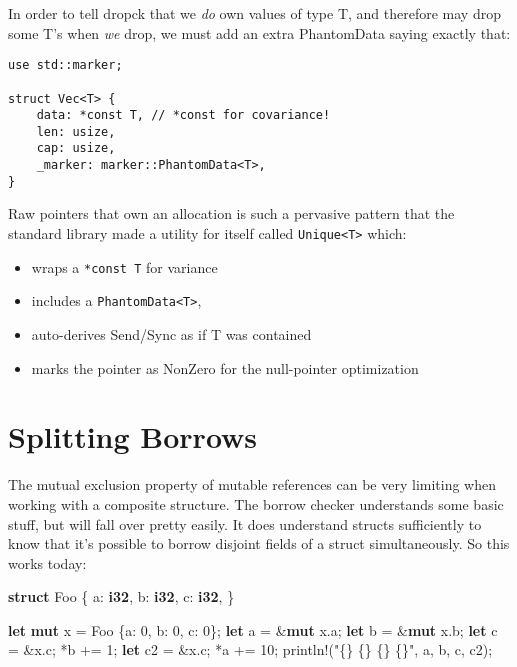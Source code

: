 \documentclass[a4paper,]{book}
\newenvironment{Shaded}{\begin{snugshade}}{\end{snugshade}}
\newcommand{\KeywordTok}[1]{\textcolor[rgb]{0.13,0.29,0.53}{\textbf{{#1}}}}
\newcommand{\DecValTok}[1]{\textcolor[rgb]{0.00,0.00,0.81}{{#1}}}
\newcommand{\StringTok}[1]{\textcolor[rgb]{0.31,0.60,0.02}{{#1}}}
\newcommand{\OtherTok}[1]{\textcolor[rgb]{0.56,0.35,0.01}{{#1}}}
\newcommand{\NormalTok}[1]{{#1}}
\begin{document}
In order to tell dropck that we \emph{do} own values of type T, and
therefore may drop some T's when \emph{we} drop, we must add an extra
PhantomData saying exactly that:

\begin{verbatim}
use std::marker;

struct Vec<T> {
    data: *const T, // *const for covariance!
    len: usize,
    cap: usize,
    _marker: marker::PhantomData<T>,
}
\end{verbatim}

Raw pointers that own an allocation is such a pervasive pattern that the
standard library made a utility for itself called
\texttt{Unique\textless{}T\textgreater{}} which:

\begin{itemize}
\itemsep1pt\parskip0pt
\item
  wraps a \texttt{*const\ T} for variance
\item
  includes a \texttt{PhantomData\textless{}T\textgreater{}},
\item
  auto-derives Send/Sync as if T was contained
\item
  marks the pointer as NonZero for the null-pointer optimization
\end{itemize}

\section{Splitting Borrows}\label{sec--borrow-splitting}

The mutual exclusion property of mutable references can be very limiting
when working with a composite structure. The borrow checker understands
some basic stuff, but will fall over pretty easily. It does understand
structs sufficiently to know that it's possible to borrow disjoint
fields of a struct simultaneously. So this works today:

\begin{Shaded}
\begin{Highlighting}[]
\KeywordTok{struct} \NormalTok{Foo \{}
    \NormalTok{a: }\KeywordTok{i32}\NormalTok{,}
    \NormalTok{b: }\KeywordTok{i32}\NormalTok{,}
    \NormalTok{c: }\KeywordTok{i32}\NormalTok{,}
\NormalTok{\}}

\KeywordTok{let} \KeywordTok{mut} \NormalTok{x = Foo \{a: }\DecValTok{0}\NormalTok{, b: }\DecValTok{0}\NormalTok{, c: }\DecValTok{0}\NormalTok{\};}
\KeywordTok{let} \NormalTok{a = &}\KeywordTok{mut} \NormalTok{x.a;}
\KeywordTok{let} \NormalTok{b = &}\KeywordTok{mut} \NormalTok{x.b;}
\KeywordTok{let} \NormalTok{c = &x.c;}
\NormalTok{*b += }\DecValTok{1}\NormalTok{;}
\KeywordTok{let} \NormalTok{c2 = &x.c;}
\NormalTok{*a += }\DecValTok{10}\NormalTok{;}
\OtherTok{println!}\NormalTok{(}\StringTok{"\{\} \{\} \{\} \{\}"}\NormalTok{, a, b, c, c2);}
\end{Highlighting}
\end{Shaded}
\end{document}
